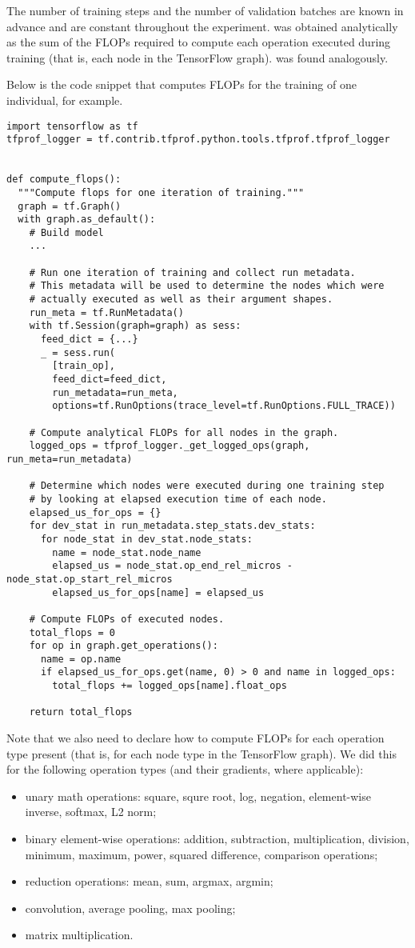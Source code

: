 \documentclass{article}
\begin{document}
The number of training steps and the number of validation batches are known in advance and are constant throughout the experiment.  was obtained analytically as the sum of the FLOPs required to compute each operation executed during training (that is, each node in the TensorFlow graph).  was found analogously.

Below is the code snippet that computes FLOPs for the training of one individual, for example.
\smallskip
\begin{lstlisting}
import tensorflow as tf
tfprof_logger = tf.contrib.tfprof.python.tools.tfprof.tfprof_logger
 

def compute_flops():
  """Compute flops for one iteration of training."""
  graph = tf.Graph()
  with graph.as_default():
    # Build model
    ...

    # Run one iteration of training and collect run metadata.
    # This metadata will be used to determine the nodes which were
    # actually executed as well as their argument shapes.
    run_meta = tf.RunMetadata()
    with tf.Session(graph=graph) as sess:
      feed_dict = {...}
      _ = sess.run(
        [train_op],
        feed_dict=feed_dict,
        run_metadata=run_meta,
        options=tf.RunOptions(trace_level=tf.RunOptions.FULL_TRACE))
 
    # Compute analytical FLOPs for all nodes in the graph.
    logged_ops = tfprof_logger._get_logged_ops(graph, run_meta=run_metadata)
 
    # Determine which nodes were executed during one training step
    # by looking at elapsed execution time of each node.
    elapsed_us_for_ops = {}
    for dev_stat in run_metadata.step_stats.dev_stats:
      for node_stat in dev_stat.node_stats:
        name = node_stat.node_name
        elapsed_us = node_stat.op_end_rel_micros - node_stat.op_start_rel_micros
        elapsed_us_for_ops[name] = elapsed_us
 
    # Compute FLOPs of executed nodes.
    total_flops = 0
    for op in graph.get_operations():
      name = op.name
      if elapsed_us_for_ops.get(name, 0) > 0 and name in logged_ops:
        total_flops += logged_ops[name].float_ops
    
    return total_flops
\end{lstlisting}

Note that we also need to declare how to compute FLOPs for each operation type present (that is, for each node type in the TensorFlow graph). We did this for the following operation types (and their gradients, where applicable):
\begin{itemize}
    \item unary math operations: square, squre root, log, negation, element-wise inverse, softmax,
      L2 norm;
    \item binary element-wise operations: addition, subtraction, multiplication, division, minimum,
      maximum, power, squared difference, comparison operations;
    \item reduction operations: mean, sum, argmax, argmin;
    \item convolution, average pooling, max pooling;
    \item matrix multiplication.
\end{itemize}
\end{document}
